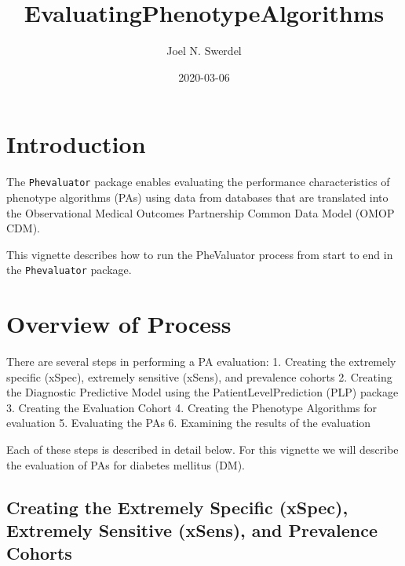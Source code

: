 \documentclass[
]{article}
\title{EvaluatingPhenotypeAlgorithms}
\author{Joel N. Swerdel}
\date{2020-03-06}
\begin{document}
\maketitle

{
\setcounter{tocdepth}{3}
\tableofcontents
}
\newpage

\hypertarget{introduction}{%
\section{Introduction}\label{introduction}}

The \texttt{Phevaluator} package enables evaluating the performance
characteristics of phenotype algorithms (PAs) using data from databases
that are translated into the Observational Medical Outcomes Partnership
Common Data Model (OMOP CDM).

This vignette describes how to run the PheValuator process from start to
end in the \texttt{Phevaluator} package.

\hypertarget{overview-of-process}{%
\section{Overview of Process}\label{overview-of-process}}

There are several steps in performing a PA evaluation: 1. Creating the
extremely specific (xSpec), extremely sensitive (xSens), and prevalence
cohorts 2. Creating the Diagnostic Predictive Model using the
PatientLevelPrediction (PLP) package 3. Creating the Evaluation Cohort
4. Creating the Phenotype Algorithms for evaluation 5. Evaluating the
PAs 6. Examining the results of the evaluation

Each of these steps is described in detail below. For this vignette we
will describe the evaluation of PAs for diabetes mellitus (DM).

\hypertarget{creating-the-extremely-specific-xspec-extremely-sensitive-xsens-and-prevalence-cohorts}{%
\subsection{Creating the Extremely Specific (xSpec), Extremely Sensitive
(xSens), and Prevalence
Cohorts}\label{creating-the-extremely-specific-xspec-extremely-sensitive-xsens-and-prevalence-cohorts}}
\end{document}
